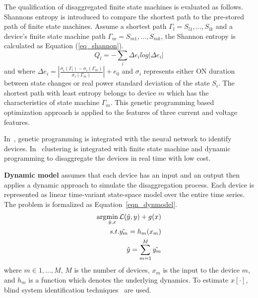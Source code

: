 The qualification of disaggregated finite state machines
is evaluated as follows. 
Shannons entropy is introduced to compare 
the shortest path 
to the pre-stored path of finite state machines.
Assume a shortest path $\Gamma_l={S_{l1},...,S_{lk}}$
and a device's finite state machine path $\Gamma_m={S_{m1},...,S_{mk}}$, 
the Shannon entropy is calculated as Equation (\ref{eq_shannon}).
\begin{equation}
Q_l=  - \sum_i \Delta e_i log|\Delta e_i|
\label{eq_shannon}
\end{equation}
and
where 
$\Delta e_i = |\frac{\sigma_i(\Gamma_l)-\sigma_i(\Gamma_m) }{\sigma_i(\Gamma_m)}|+e_0 $
and $\sigma_i$ represents either ON duration between state changes or real power standard deviation of
the state $S_i$.
The shortest path with least entropy belongs to device $m$ which has the characteristics of 
state machine $\Gamma_m$.
This genetic programming based optimization approach 
is applied to the features of three current and voltage features. 

In~\cite{chang2010newmethod},
genetic programming is integrated with the neural network
to identify devices. In~\cite{vogiatzis2013real} clustering is integrated with finite state machine 
and dynamic programming to disaggregate the devices in real time with low cost.

\textbf{Dynamic model}
\cite{dong2013dynamical} assumes that each device has an input and an output then 
applies a dynamic approach to simulate the disaggregation process. 
Each device is represented as linear time-variant state-space model over the 
entire time series. 
The problem is formalized as Equation~\eqref{eqn_dynmodel}.
\begin{equation}
\label{eqn_dynmodel}
\begin{aligned}
\arg\!\min_{\hat{y},x} \mathcal{L}(\hat{y},y) + g(x) \\
s.t. \hat{y_m} = h_m(x_m)\\
\hat{y}=\sum_{m=1}^{M} \hat{y_m}
\end{aligned}
\end{equation}
where $m\in{1,...,M}$, $M$ is the number of devices, $x_m$ is the input to the device $m$, and 
$h_m$ is a function which denotes the underlying dynamics. 
To estimate $x[\cdot]$, blind system identification techniques~\cite{abed1997blind} are used. 

